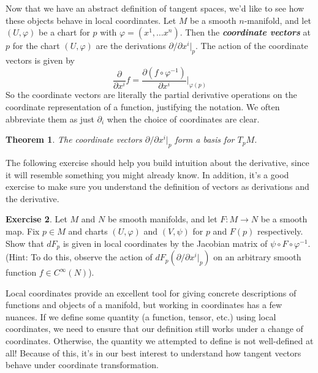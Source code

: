 \documentclass[psamsfonts]{amsart}
\newtheorem{thm}{Theorem}[section]
\theoremstyle{definition}
\newtheorem{exer}[thm]{Exercise}
\theoremstyle{remark}
\newcommand{\ib}[1]{\textbf{\textit{#1}}}
\newcommand{\inv}{^{-1}}
\begin{document}
Now that we have an abstract definition of tangent spaces, we'd like to see how
these objects behave in local coordinates. Let $M$ be a smooth $n$-manifold,
and let $(U,\varphi)$ be a chart for $p$ with $\varphi = (x^1 ,\ldots x^n)$.
Then the \ib{coordinate vectors} at $p$ for the chart $(U, \varphi)$ are the
derivations $\partial/\partial x^i\vert_p$. The action of the coordinate
vectors is given by
$$\frac{\partial}{\partial x^i}f =
\frac{\partial (f \circ \varphi\inv)}{\partial x^i}\bigg\vert_{\varphi(p)} $$
So the coordinate vectors are literally the partial derivative operations on
the coordinate representation of a function, justifying the notation. We often
abbreviate them as just $\partial_i$ when the choice of coordinates are clear.
%
\begin{thm}
	The coordinate vectors $\partial/ \partial x^i \vert_p$ form a basis
	for $T_pM$.
\end{thm}
%
The following exercise should help you build intuition about the derivative,
since it will resemble something you might already know. In addition, it's
a good exercise to make sure you understand the definition of vectors as
derivations and the derivative.
%
\begin{exer}
Let $M$ and $N$ be smooth manifolds, and let $F : M \to N$ be a smooth map.
Fix $p \in M$ and charts $(U, \varphi)$ and $(V, \psi)$ for $p$ and $F(p)$
respectively. Show that $dF_p$ is given in local coordinates by the Jacobian
matrix of $\psi \circ F \circ \varphi\inv$. (Hint: To do this, observe
the action of $dF_p(\partial /\partial x^i\vert_p)$ on an arbitrary smooth
function $f \in C^\infty(N)$).
\end{exer}
%
Local coordinates provide an excellent tool for giving concrete descriptions
of functions and objects of a manifold, but working in coordinates has a few
nuances. If we define some quantity (a function, tensor, etc.) using local
coordinates, we need to ensure that our definition still works under a change
of coordinates. Otherwise, the quantity we attempted to define is not
well-defined at all! Because of this, it's in our best interest to understand
how tangent vectors behave under coordinate transformation. \\
\end{document}
